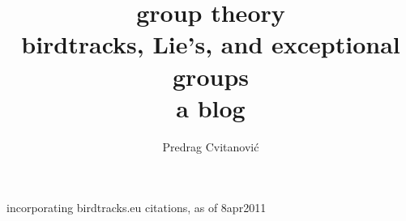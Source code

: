 \documentclass[10pt,openany]{book}
\title{   \Large group theory
       \\[4pt] \Large birdtracks, Lie's, and exceptional groups
       \\ \Huge  a blog}
\author{Predrag Cvitanovi\'{c}}
\begin{document}
\maketitle

\tableofcontents



\newpage
  incorporating birdtracks.eu citations, as of 8apr2011

\newpage
\printbibliography[
heading=bibintoc,
title={References}
				  ] %
\end{document}
